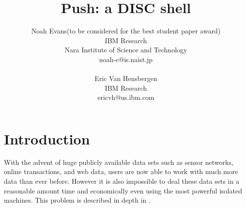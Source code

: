 \documentclass[11pt, letterpaper]{article}
\title{Push: a DISC shell}
\author{Noah Evans(to be considered for the best student paper award)\\
IBM Research\\
Nara Institute of Science and Technology\\
noah-e@is.naist.jp\\\\
Eric Van Hensbergen\\
IBM Research\\
ericvh@us.ibm.com\\
}
\date{}
\begin{document}
\maketitle

\pagebreak

%
%
%

\renewcommand{\topfraction}{0.85}
\renewcommand{\textfraction}{0.1}



\section{Introduction}

With the advent of huge publicly available data sets such as sensor networks, online transactions, and web data, users are now able to work with much more data than ever before. However it is also impossible to deal these data sets in a reasonable amount time and economically even using the most powerful isolated machines. This problem is described in depth in \cite{barroso2003wsp}.
\end{document}
